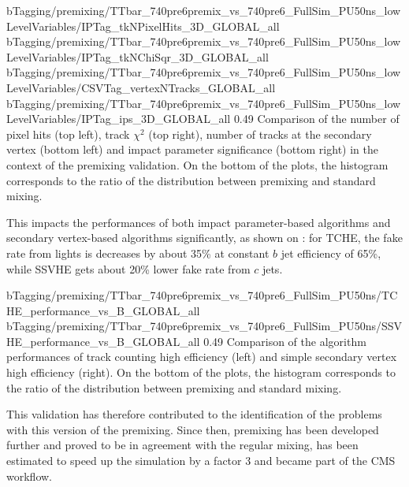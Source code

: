                       {bTagging/premixing/TTbar_740pre6premix_vs_740pre6_FullSim_PU50ns_lowLevelVariables/IPTag_tkNPixelHits_3D_GLOBAL_all}
                      {bTagging/premixing/TTbar_740pre6premix_vs_740pre6_FullSim_PU50ns_lowLevelVariables/IPTag_tkNChiSqr_3D_GLOBAL_all}
                      {bTagging/premixing/TTbar_740pre6premix_vs_740pre6_FullSim_PU50ns_lowLevelVariables/CSVTag_vertexNTracks_GLOBAL_all}
                      {bTagging/premixing/TTbar_740pre6premix_vs_740pre6_FullSim_PU50ns_lowLevelVariables/IPTag_ips_3D_GLOBAL_all}
                      {0.49}
                      {Comparison of the number of pixel hits (top left), track $\chi^2$
                      (top right), number of tracks at the secondary vertex (bottom left) and
                      impact parameter significance (bottom right) in the context
                      of the premixing validation. On the bottom of the plots, the histogram corresponds
                      to the ratio of the distribution between premixing and standard mixing. }

    This impacts the performances of both impact parameter-based algorithms and
     secondary vertex-based algorithms significantly, as shown on
    : for TCHE, the fake rate from lights 
    is decreases by about 35\% at constant $b$ jet efficiency of 65\%, while SSVHE gets about 20\%
    lower fake rate from $c$ jets.

                     {bTagging/premixing/TTbar_740pre6premix_vs_740pre6_FullSim_PU50ns/TCHE_performance_vs_B_GLOBAL_all}
                     {bTagging/premixing/TTbar_740pre6premix_vs_740pre6_FullSim_PU50ns/SSVHE_performance_vs_B_GLOBAL_all}
                     {0.49}
                     {Comparison of the algorithm performances of track counting high
                      efficiency (left) and simple secondary vertex high efficiency (right).
                      On the bottom of the plots, the histogram corresponds
                      to the ratio of the distribution between premixing and standard mixing. }

    This validation has therefore contributed to the identification of the problems with
    this version of the premixing. Since then, premixing has been developed further and
    proved to be in agreement with the regular mixing, has been estimated to speed up the
    simulation by a factor 3 \cite{Premixing} and became part of the CMS workflow.

